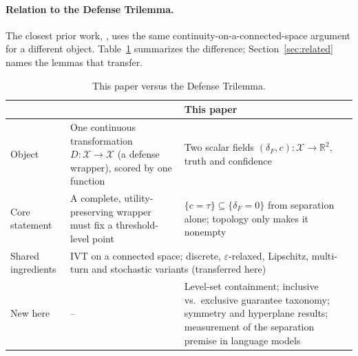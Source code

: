 \documentclass[10pt]{article}
\theoremstyle{definition}
\theoremstyle{remark}
\newcommand{\X}{\mathcal{X}}
\newcommand{\R}{\mathbb{R}}
\newcommand{\conf}{c}
\newcommand{\dF}{\delta_{\!F}}
\begin{document}
\paragraph{Relation to the Defense Trilemma.}
The closest prior work, \citet{bhatt2026defense}, uses the same
continuity-on-a-connected-space argument for a different object.
Table~\ref{tab:dt} summarizes the difference; Section~\ref{sec:related}
names the lemmas that transfer.

\begin{table}[h]
\centering
\caption{This paper versus the Defense Trilemma.}
\label{tab:dt}
\footnotesize
\begin{tabular}{@{}p{3.1cm}p{5.4cm}p{5.4cm}@{}}
\toprule
& \citet{bhatt2026defense} & This paper \\
\midrule
Object & One continuous transformation $D:\X\to\X$ (a defense wrapper), scored by one function & Two scalar fields $(\dF,\conf):\X\to\R^2$, truth and confidence \\
Core statement & A complete, utility-preserving wrapper must fix a threshold-level point & $\{\conf=\tau\}\subseteq\{\dF=0\}$ from separation alone; topology only makes it nonempty \\
Shared ingredients & \multicolumn{2}{p{10.8cm}}{IVT on a connected space; discrete, $\varepsilon$-relaxed, Lipschitz, multi-turn and stochastic variants (transferred here)} \\
New here & -- & Level-set containment; inclusive vs.\ exclusive guarantee taxonomy; symmetry and hyperplane results; measurement of the separation premise in language models \\
\bottomrule
\end{tabular}
\end{table}
\end{document}
